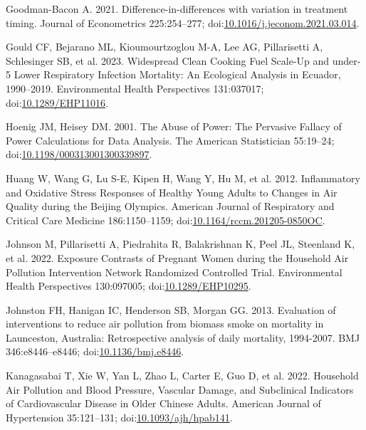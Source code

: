 \documentclass[
  letterpaper,
  DIV=11,
  numbers=noendperiod]{scrartcl}
\newlength{\cslhangindent}
\newenvironment{CSLReferences}[2] %
 {\begin{list}{}{%
  \setlength{\itemindent}{0pt}
  \setlength{\leftmargin}{0pt}
  \setlength{\parsep}{0pt}
  \ifodd #1
   \setlength{\leftmargin}{\cslhangindent}
   \setlength{\itemindent}{-1\cslhangindent}
  \fi
  \setlength{\itemsep}{#2\baselineskip}}}
 {\end{list}}
\begin{document}
\begin{CSLReferences}{1}{1}
Goodman-Bacon A. 2021. Difference-in-differences with variation in
treatment timing. Journal of Econometrics 225:254--277;
doi:\href{https://doi.org/10.1016/j.jeconom.2021.03.014}{10.1016/j.jeconom.2021.03.014}.

Gould CF, Bejarano ML, Kioumourtzoglou M-A, Lee AG, Pillarisetti A,
Schlesinger SB, et al. 2023. Widespread {Clean Cooking Fuel Scale-Up}
and under-5 {Lower Respiratory Infection Mortality}: {An Ecological
Analysis} in {Ecuador}, 1990--2019. Environmental Health Perspectives
131:037017;
doi:\href{https://doi.org/10.1289/EHP11016}{10.1289/EHP11016}.

Hoenig JM, Heisey DM. 2001. The {Abuse} of {Power}: {The Pervasive
Fallacy} of {Power Calculations} for {Data Analysis}. The American
Statistician 55:19--24;
doi:\href{https://doi.org/10.1198/000313001300339897}{10.1198/000313001300339897}.

Huang W, Wang G, Lu S-E, Kipen H, Wang Y, Hu M, et al. 2012.
Inflammatory and {Oxidative Stress Responses} of {Healthy Young Adults}
to {Changes} in {Air Quality} during the {Beijing Olympics}. American
Journal of Respiratory and Critical Care Medicine 186:1150--1159;
doi:\href{https://doi.org/10.1164/rccm.201205-0850OC}{10.1164/rccm.201205-0850OC}.

Johnson M, Pillarisetti A, Piedrahita R, Balakrishnan K, Peel JL,
Steenland K, et al. 2022. Exposure {Contrasts} of {Pregnant Women}
during the {Household Air Pollution Intervention Network Randomized
Controlled Trial}. Environmental Health Perspectives 130:097005;
doi:\href{https://doi.org/10.1289/EHP10295}{10.1289/EHP10295}.

Johnston FH, Hanigan IC, Henderson SB, Morgan GG. 2013. Evaluation of
interventions to reduce air pollution from biomass smoke on mortality in
{Launceston}, {Australia}: Retrospective analysis of daily mortality,
1994-2007. BMJ 346:e8446--e8446;
doi:\href{https://doi.org/10.1136/bmj.e8446}{10.1136/bmj.e8446}.

Kanagasabai T, Xie W, Yan L, Zhao L, Carter E, Guo D, et al. 2022.
Household {Air Pollution} and {Blood Pressure}, {Vascular Damage}, and
{Subclinical Indicators} of {Cardiovascular Disease} in {Older Chinese
Adults}. American Journal of Hypertension 35:121--131;
doi:\href{https://doi.org/10.1093/ajh/hpab141}{10.1093/ajh/hpab141}.


\end{CSLReferences}
\end{document}
